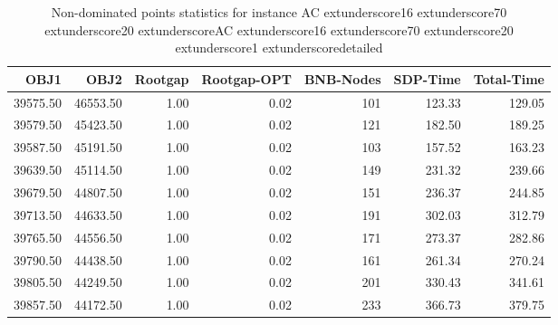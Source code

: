 \begin{table}
\caption{Non-dominated points statistics for instance AC	extunderscore16	extunderscore70	extunderscore20	extunderscoreAC	extunderscore16	extunderscore70	extunderscore20	extunderscore1	extunderscoredetailed}
\label{tab:stats/AC_16_70_20_AC_16_70_20_1_detailed}
\begin{tabular}{rrrrrrr}
\toprule
OBJ1 & OBJ2 & Rootgap & Rootgap-OPT & BNB-Nodes & SDP-Time & Total-Time \\
\midrule
39575.50 & 46553.50 & 1.00 & 0.02 & 101 & 123.33 & 129.05 \\
39579.50 & 45423.50 & 1.00 & 0.02 & 121 & 182.50 & 189.25 \\
39587.50 & 45191.50 & 1.00 & 0.02 & 103 & 157.52 & 163.23 \\
39639.50 & 45114.50 & 1.00 & 0.02 & 149 & 231.32 & 239.66 \\
39679.50 & 44807.50 & 1.00 & 0.02 & 151 & 236.37 & 244.85 \\
39713.50 & 44633.50 & 1.00 & 0.02 & 191 & 302.03 & 312.79 \\
39765.50 & 44556.50 & 1.00 & 0.02 & 171 & 273.37 & 282.86 \\
39790.50 & 44438.50 & 1.00 & 0.02 & 161 & 261.34 & 270.24 \\
39805.50 & 44249.50 & 1.00 & 0.02 & 201 & 330.43 & 341.61 \\
39857.50 & 44172.50 & 1.00 & 0.02 & 233 & 366.73 & 379.75 \\
\bottomrule
\end{tabular}
\end{table}
